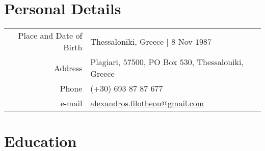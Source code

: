 \documentclass[a4paper,10pt,twoside]{article}
\begin{document}


\par{\bigskip\par}

\section{Personal Details}

\begin{tabular}{rp{10cm}}
Place and Date of Birth 	& Thessaloniki, Greece | $8$ Nov $1987$ \\
Address            			  & Plagiari, $57500$, PO Box $530$, Thessaloniki, Greece \\
Phone						          & (+30) 693 87 87 677 \\
e-mail                    & \href{mailto:alexandros.filotheou@gmail.com}{alexandros.filotheou@gmail.com}
\end{tabular}


\section{Education}
\end{document}
